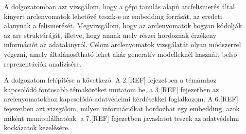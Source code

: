 
A dolgozatomban azt vizsgálom, hogy a gépi tanulás alapú arcfelismerés által kinyert arclenyomatok lehetővé teszik-e az embedding forrását, az eredeti alanynak a felismerését. Megvizsgálom, hogy az arclenyomatok hogyan kódolják az arc struktúráját, illetve, hogy annak mely részei hordoznak érzékeny információt az adatalanyról. Célom arclenyomatok vizsgálatát olyan módszerrel végezni, amely általánosítható lehet akár generatív modelleknél használt belső reprezentációk analízisére.

A dolgozatom felépítése a következő. A 2.[REF] fejezetben a témámhoz kapcsolódó fontosabb témaköröket mutatom be, a 3.[REF] fejezetben az arclenyomatokhoz kapcsolódó adatvédelmi kérdésekkel foglalkozom. A 6.[REF] fejezetben azt vizsgálom, milyen információkat hordozhat egy embedding, azok miként manipulálhatóak. a 7.[REF] fejezetben javaslatot teszek az adatvédelmi kockázatok kezelésére.




